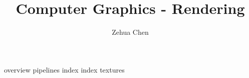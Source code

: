 \documentclass[letterpaper, 11pt]{report}
\title{Computer Graphics - Rendering}
\author{Zehua Chen}
\begin{document}
  \maketitle
  \tableofcontents

  {overview}
  {pipelines}
  {index}
  {index}
  {textures}
\end{document}

